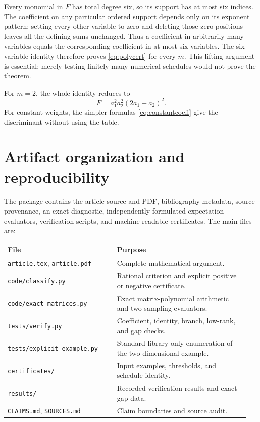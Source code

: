 \documentclass[11pt,letterpaper]{article}
\numberwithin{equation}{section}
\theoremstyle{definition}
\begin{document}
Every monomial in $F$ has total degree six, so its support has at most six indices. The coefficient on any particular ordered support depends only on its exponent pattern: setting every other variable to zero and deleting those zero positions leaves all the defining sums unchanged. Thus a coefficient in arbitrarily many variables equals the corresponding coefficient in at most six variables. The six-variable identity therefore proves \eqref{eq:polycert} for every $m$. This lifting argument is essential; merely testing finitely many numerical schedules would not prove the theorem.

For $m=2$, the whole identity reduces to
\[
 F=a_1^2a_2^2(2a_1+a_2)^2.
\]
For constant weights, the simpler formulas \eqref{eq:constantcoeff} give the discriminant without using the table.

\section{Artifact organization and reproducibility}
\label{app:artifacts}

The package contains the article source and PDF, bibliography metadata, source provenance, an exact diagnostic, independently formulated expectation evaluators, verification scripts, and machine-readable certificates. The main files are:
\begin{center}\small
\begin{tabular}{@{}>{\raggedright\arraybackslash}p{0.43\linewidth}>{\raggedright\arraybackslash}p{0.52\linewidth}@{}}
\toprule
File & Purpose\\
\midrule
\texttt{article.tex}, \texttt{article.pdf} & Complete mathematical argument.\\
\texttt{code/classify.py} & Rational criterion and explicit positive or negative certificate.\\
\texttt{code/exact\_matrices.py} & Exact matrix-polynomial arithmetic and two sampling evaluators.\\
\texttt{tests/verify.py} & Coefficient, identity, branch, low-rank, and gap checks.\\
\texttt{tests/explicit\_example.py} & Standard-library-only enumeration of the two-dimensional example.\\
\texttt{certificates/} & Input examples, thresholds, and schedule identity.\\
\texttt{results/} & Recorded verification results and exact gap data.\\
\texttt{CLAIMS.md}, \texttt{SOURCES.md} & Claim boundaries and source audit.\\
\bottomrule
\end{tabular}
\end{center}
\end{document}
